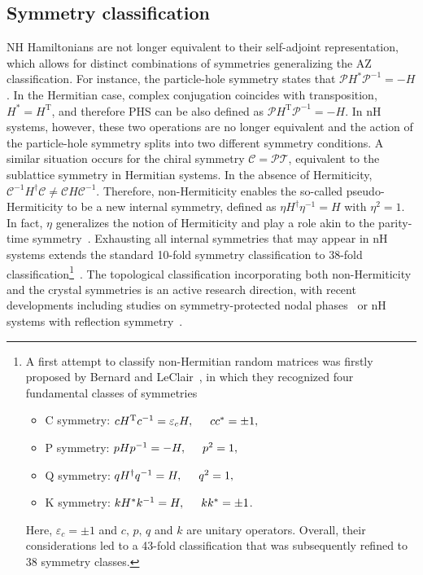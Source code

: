 \subsection{Symmetry classification}
NH Hamiltonians are not longer equivalent to their self-adjoint representation, which allows for distinct combinations of symmetries generalizing the AZ classification. For instance, the particle-hole symmetry states that $\mathcal{P} H^* \mathcal{P}^{-1} = -H$. In the Hermitian case, complex conjugation coincides with transposition, $H^* = H^{\mathrm{T}}$, and therefore PHS can be also defined as $\mathcal{P} H^{\mathrm{T}} \mathcal{P}^{-1} = -H$. In nH systems, however, these two operations are no longer equivalent and the action of the particle-hole symmetry splits into two different symmetry conditions. A similar situation occurs for the chiral symmetry $\mathcal{C} = \mathcal{PT}$, equivalent to the sublattice symmetry in Hermitian systems. In the absence of Hermiticity, $\mathcal{C}^{-1} H^{\dagger} \mathcal{C} \neq \mathcal{C} H \mathcal{C}^{-1}$. Therefore, non-Hermiticity enables the so-called pseudo-Hermiticity to be a new internal symmetry, defined as $\eta H^{\dagger} \eta^{-1} = H$ with $\eta^2 = 1$. In fact, $\eta$ generalizes the notion of Hermiticity and play a role akin to the parity-time symmetry~\cite{doi:10.1063/1.1418246}. Exhausting all internal symmetries that may appear in nH systems extends the standard 10-fold symmetry classification to 38-fold classification\footnote{A first attempt to classify non-Hermitian random matrices was firstly proposed by Bernard and LeClair~\cite{Bernard_2002}, in which they recognized four fundamental classes of symmetries
\begin{itemize}[noitemsep,topsep=0pt]
\item C symmetry: $c H^{\mathrm{T}} c^{-1} = \varepsilon_c H, \hspace*{0.5cm} c c^*= \pm 1,$
\item P symmetry: $p H p^{-1} = -H, \hspace*{0.5cm} p^2 = 1,$
\item Q symmetry: $q H^{\dagger} q^{-1} = H, \hspace*{0.5cm} q^2 = 1,$
\item K symmetry: $k H^* k^{-1} = H, \hspace*{0.5cm} k k^* = \pm 1$.
\end{itemize}
Here, $\varepsilon_c = \pm 1$ and $c, \, p, \, q$ and $k$ are unitary operators. Overall, their considerations led to a 43-fold classification that was subsequently refined to 38 symmetry classes.}~\cite{PhysRevX.9.041015, PhysRevX.8.031079, PhysRevLett.120.146402, PhysRevB.101.205417, PhysRevB.99.235112}. The topological classification incorporating both non-Hermiticity and the crystal symmetries is an active research direction, with recent developments including studies on symmetry-protected nodal phases~\cite{PhysRevB.99.041406} or nH systems with reflection symmetry~\cite{PhysRevB.99.125103}. 

